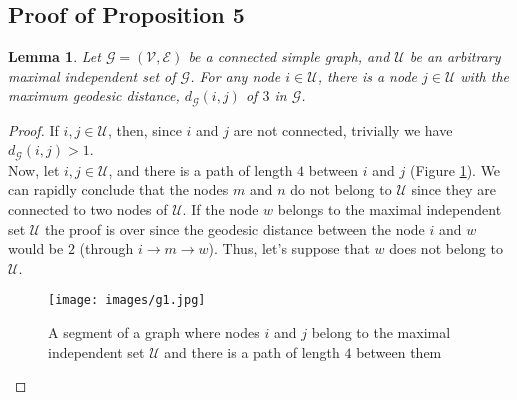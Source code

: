 \documentclass{article}
\newtheorem{lemma}{Lemma}
\begin{document}
\subsection{Proof of Proposition 5}
\begin{lemma}\label{lem:1}
	Let $\mathcal{G} = (\mathcal{V}, \mathcal{E})$ be a connected simple graph, and $\mathcal{U}$ be an arbitrary maximal independent set of $\mathcal{G}$. For any node $i \in \mathcal{U}$, there is a node $j \in \mathcal{U}$ with the maximum geodesic distance, $d_\mathcal{G}(i, j)$ of $3$ in $\mathcal{G}$.
\end{lemma}
\begin{proof}
	If $i,j \in \mathcal{U}$, then, since $i$ and $j$ are not connected, trivially we have $d_\mathcal{G}(i, j) > 1$.\\
	Now, let $i, j \in \mathcal{U}$, and there is a path of length $4$ between $i$ and $j$ (Figure \ref{fig:g1}). We can rapidly conclude that the nodes $m$ and $n$ do not belong to $\mathcal{U}$ since they are connected to two nodes of $\mathcal{U}$. If the node $w$ belongs to the maximal independent set $\mathcal{U}$ the proof is over since the geodesic distance between the node $i$ and $w$ would be $2$ (through $i \rightarrow m \rightarrow w$). Thus, let's suppose that $w$ does not belong to $\mathcal{U}$.
	
	\begin{figure}[!ht]
		\begin{center}
			\texttt{[image: images/g1.jpg]}
			\caption{A segment of a graph where nodes $i$ and $j$ belong to the maximal independent set $\mathcal{U}$ and there is a path of length $4$ between them}
			\label{fig:g1}
		\end{center}
	\end{figure}
	

\end{proof}
\end{document}
